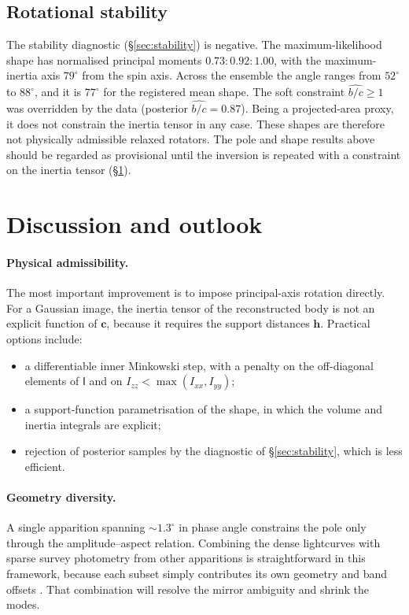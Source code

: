 \documentclass[11pt,a4paper]{article}
\theoremstyle{remark}
\newcommand{\vect}[1]{\bm{#1}}
\begin{document}
\subsection{Rotational stability}
The stability diagnostic (\S\ref{sec:stability}) is negative. The maximum-likelihood shape has
normalised principal moments $0.73:0.92:1.00$, with the maximum-inertia axis $79^\circ$ from the spin
axis. Across the ensemble the angle ranges from $52^\circ$ to $88^\circ$, and it is $77^\circ$ for the
registered mean shape. The soft constraint $\widehat{b/c}\ge1$ was overridden by the data (posterior
$\widehat{b/c}=0.87$). Being a projected-area proxy, it does not constrain the inertia tensor in any
case. These shapes are therefore not physically admissible relaxed rotators. The pole and shape results
above should be regarded as provisional until the inversion is repeated with a constraint on the
inertia tensor (\S\ref{sec:discussion}).

\section{Discussion and outlook}
\label{sec:discussion}

\paragraph{Physical admissibility.} The most important improvement is to impose principal-axis
rotation directly. For a Gaussian image, the inertia tensor of the reconstructed body is not an
explicit function of $\vect c$, because it requires the support distances $\vect h$. Practical options
include:
\begin{itemize}[nosep]
\item a differentiable inner Minkowski step, with a penalty on the off-diagonal elements of
  $\mathsf I$ and on $I_{zz}<\max(I_{xx},I_{yy})$;
\item a support-function parametrisation of the shape, in which the volume and inertia integrals are
  explicit;
\item rejection of posterior samples by the diagnostic of \S\ref{sec:stability}, which is less
  efficient.
\end{itemize}

\paragraph{Geometry diversity.} A single apparition spanning $\sim1.3^\circ$ in phase angle constrains
the pole only through the amplitude--aspect relation. Combining the dense lightcurves with sparse survey
photometry from other apparitions is straightforward in this framework, because each subset simply
contributes its own geometry and band offsets \citep{durech2009}. That combination will resolve the
mirror ambiguity and shrink the modes.
\end{document}
